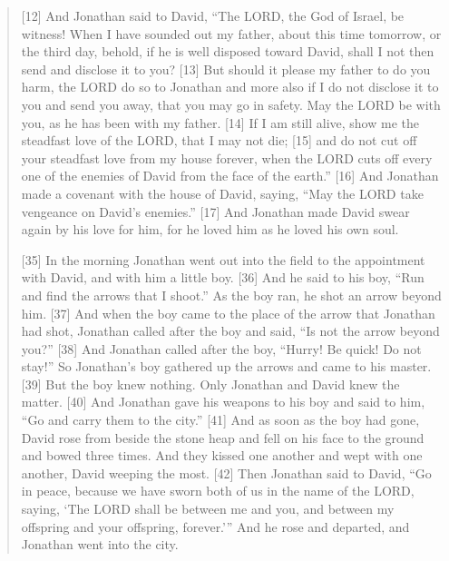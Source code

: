 \begin{quote}
    [12] And Jonathan said to David, “The LORD, the God of Israel, be
    witness!  When I have sounded out my father, about this time tomorrow, or
    the third day, behold, if he is well disposed toward David, shall I not
    then send and disclose it to you?  [13] But should it please my father to
    do you harm, the LORD do so to Jonathan and more also if I do not
    disclose it to you and send you away, that you may go in safety.  May the
    LORD be with you, as he has been with my father.  [14] If I am still
    alive, show me the steadfast love of the LORD, that I may not die; [15]
    and do not cut off your steadfast love from my house forever, when the
    LORD cuts off every one of the enemies of David from the face of the
    earth.” [16] And Jonathan made a covenant with the house of David,
    saying, “May the LORD take vengeance on David’s enemies.” [17] And
    Jonathan made David swear again by his love for him, for he loved him as
    he loved his own soul.

    [35] In the morning Jonathan went out into the field to the appointment
    with David, and with him a little boy.  [36] And he said to his boy, “Run
    and find the arrows that I shoot.” As the boy ran, he shot an arrow
    beyond him.  [37] And when the boy came to the place of the arrow that
    Jonathan had shot, Jonathan called after the boy and said, “Is not the
    arrow beyond you?” [38] And Jonathan called after the boy, “Hurry!  Be
    quick!  Do not stay!” So Jonathan’s boy gathered up the arrows and came
    to his master.  [39] But the boy knew nothing.  Only Jonathan and David
    knew the matter.  [40] And Jonathan gave his weapons to his boy and said
    to him, “Go and carry them to the city.” [41] And as soon as the boy had
    gone, David rose from beside the stone heap and fell on his face to the
    ground and bowed three times.  And they kissed one another and wept with
    one another, David weeping the most.  [42] Then Jonathan said to David,
    “Go in peace, because we have sworn both of us in the name of the LORD,
    saying, ‘The LORD shall be between me and you, and between my offspring
    and your offspring, forever.’” And he rose and departed, and Jonathan
    went into the city.
  \end{quote}
